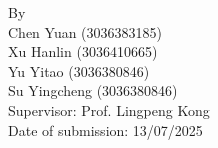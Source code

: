\begin{titlepage}
\begin{center}
\vspace{40pt} %


\begin{center}
    {By\\
    Chen Yuan (3036383185)\\
    Xu Hanlin (3036410665)\\
    Yu Yitao (3036380846)\\
    Su Yingcheng (3036380846)\\[10pt]

    
    Supervisor: Prof. Lingpeng Kong\\ %
    Date of submission: 13/07/2025} %
\end{center}

\vfill
\end{center}

\end{titlepage}


